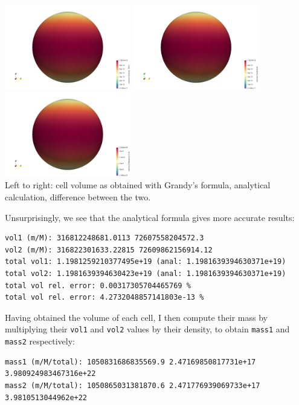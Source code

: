 \begin{center}
\includegraphics[width=5.5cm]{python_codes/fieldstone_98/images/vol1}
\includegraphics[width=5.5cm]{python_codes/fieldstone_98/images/vol2}
\includegraphics[width=5.5cm]{python_codes/fieldstone_98/images/voldiff}\\
{\captionfont Left to right: cell volume as obtained with Grandy's formula, 
analytical calculation, difference between the two.}
\end{center}

Unsurprisingly, we see that the analytical formula gives more accurate results:
\begin{verbatim}
vol1 (m/M): 316812248681.0113 72607558204572.3
vol2 (m/M): 316822301633.22815 72609862156914.12
total vol1: 1.1981259210377495e+19 (anal: 1.1981639394630371e+19)
total vol2: 1.1981639394630423e+19 (anal: 1.1981639394630371e+19)
total vol rel. error: 0.00317305704465769 %
total vol rel. error: 4.2732048857141803e-13 %
\end{verbatim}

Having obtained the volume of each cell, I then compute their mass by multiplying 
their {\tt vol1} and {\tt vol2} values by their density, to obtain 
{\tt mass1} and {\tt mass2} respectively:

\begin{verbatim}
mass1 (m/M/total): 1050831686835569.9 2.47169850817731e+17 3.980924983467316e+22
mass2 (m/M/total): 1050865031381870.6 2.471776939069733e+17 3.9810513044962e+22
\end{verbatim}


